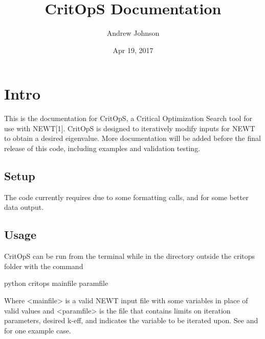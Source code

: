\documentclass[letterpaper,10pt,english]{sphinxmanual}
\title{CritOpS Documentation}
\date{Apr 19, 2017}
\author{Andrew Johnson}
\begin{document}
\maketitle
\sphinxtableofcontents
{}\label{\detokenize{index::doc}}



\chapter{Intro}
\label{\detokenize{intro::doc}}\label{\detokenize{intro:intro}}\label{\detokenize{intro:welcome-to-critops-s-documentation}}
This is the documentation for CritOpS, a Critical Optimization Search tool for use with NEWT{[}1{]}.
CritOpS is designed to iteratively modify inputs for NEWT to obtain a desired eigenvalue.
More documentation will be added before the final release of this code, including examples and validation testing.


\section{Setup}
\label{\detokenize{intro:setup}}\label{\detokenize{intro:id1}}
\begin{sphinxVerbatim}[commandchars=\\\{\}]
  
 
  
\end{sphinxVerbatim}

The code currently requires  due to some formatting calls, and  for some better data output.


\section{Usage}
\label{\detokenize{intro:id2}}\label{\detokenize{intro:usage}}
CritOpS can be run from the terminal while in the directory outside the critops folder with the command

\begin{sphinxVerbatim}[commandchars=\\\{\}]
\PYGZdl{} python critops \PYGZlt{}mainfile\PYGZgt{} \PYGZlt{}paramfile\PYGZgt{}
\end{sphinxVerbatim}

Where \textless{}mainfile\textgreater{} is a valid NEWT input file with some variables in place of valid values and \textless{}paramfile\textgreater{} is the
file that contains limits on iteration parameters, desired k-eff, and indicates the variable to be iterated upon.
See  and  for one example case.
\end{document}
